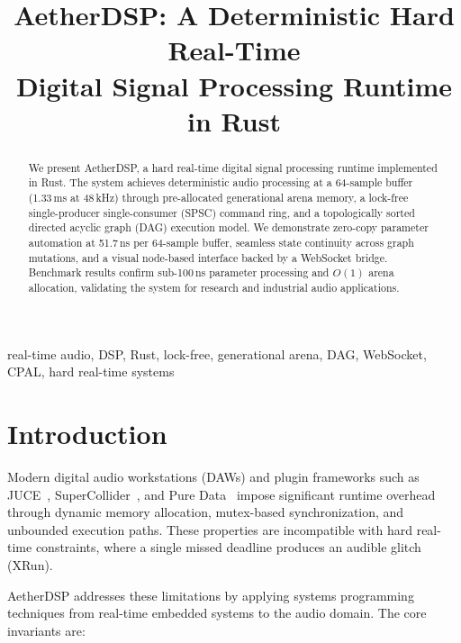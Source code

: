 \documentclass[conference]{IEEEtran}
\begin{document}
\title{AetherDSP: A Deterministic Hard Real-Time\\
Digital Signal Processing Runtime in Rust}

\author{
}

\maketitle

\begin{abstract}
We present AetherDSP, a hard real-time digital signal processing runtime
implemented in Rust. The system achieves deterministic audio processing at a
64-sample buffer (1.33\,ms at 48\,kHz) through pre-allocated generational arena
memory, a lock-free single-producer single-consumer (SPSC) command ring, and a
topologically sorted directed acyclic graph (DAG) execution model. We demonstrate
zero-copy parameter automation at 51.7\,ns per 64-sample buffer, seamless state
continuity across graph mutations, and a visual node-based interface backed by a
WebSocket bridge. Benchmark results confirm sub-100\,ns parameter processing and
$O(1)$ arena allocation, validating the system for research and industrial audio
applications.
\end{abstract}

\begin{IEEEkeywords}
real-time audio, DSP, Rust, lock-free, generational arena, DAG, WebSocket, CPAL,
hard real-time systems
\end{IEEEkeywords}

\section{Introduction}

Modern digital audio workstations (DAWs) and plugin frameworks such as
JUCE~\cite{juce}, SuperCollider~\cite{supercollider}, and Pure Data~\cite{puredata}
impose significant runtime overhead through dynamic memory allocation,
mutex-based synchronization, and unbounded execution paths. These properties are
incompatible with hard real-time constraints, where a single missed deadline
produces an audible glitch (XRun).

AetherDSP addresses these limitations by applying systems programming techniques
from real-time embedded systems to the audio domain. The core invariants are:
\end{document}
